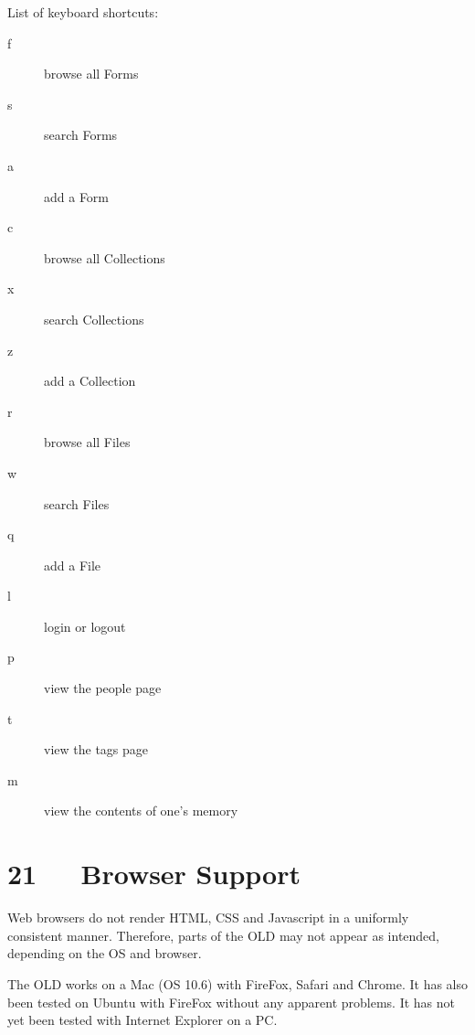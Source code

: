 \documentclass[letterpaper,10pt,english]{sphinxmanual}
\begin{document}
List of keyboard shortcuts:
\begin{description}
\item[{f}] \leavevmode
browse all Forms

\item[{s}] \leavevmode
search Forms

\item[{a}] \leavevmode
add a Form

\item[{c}] \leavevmode
browse all Collections

\item[{x}] \leavevmode
search Collections

\item[{z}] \leavevmode
add a Collection

\item[{r}] \leavevmode
browse all Files

\item[{w}] \leavevmode
search Files

\item[{q}] \leavevmode
add a File

\item[{l}] \leavevmode
login or logout

\item[{p}] \leavevmode
view the people page

\item[{t}] \leavevmode
view the tags page

\item[{m}] \leavevmode
view the contents of one's memory

\end{description}


\chapter{21   Browser Support}
\label{user_guide:browser-support}
Web browsers do not render HTML, CSS and Javascript in a uniformly consistent
manner.  Therefore, parts of the OLD may not appear as intended, depending on
the OS and browser.

The OLD works on a Mac (OS 10.6) with FireFox, Safari and Chrome.  It has also
been tested on Ubuntu with FireFox without any apparent problems.  It has not
yet been tested with Internet Explorer on a PC.
\end{document}
